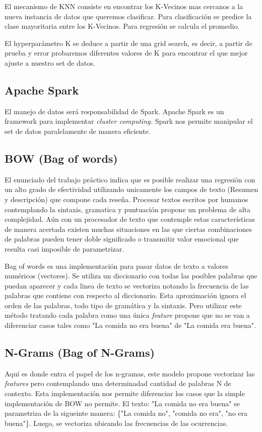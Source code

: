 \documentclass[a4paper,10pt]{article}
\begin{document}
	El mecanismo de KNN consiste en encontrar los K-Vecinos mas cercanos a la nueva instancia de datos que queremos clasificar. Para clasificaci\'{o}n se predice la clase mayoritaria entre los K-Vecinos. Para regresi\'{o}n se calcula el promedio.
	
	El hyperpar\'{a}metro K se deduce a partir de una grid search, es decir, a partir de prueba y error probaremos diferentes valores de K para encontrar el que mejor ajuste a nuestro set de datos.
	
	\subsection{Apache Spark}
	El manejo de datos ser\'{a} responsabilidad de Spark. Apache Spark es un framework para implementar \textit{cluster computing.} Spark nos permite manipular el set de datos paralelamente de manera eficiente. 
	
	\subsection{BOW (Bag of words)}
	El enunciado del trabajo pr\'{a}ctico indica que es posible realizar una regresi\'{o}n con un alto grado de efectividad utilizando unicamente los campos de texto (Resumen y descripci\'{o}n) que compone cada rese\~{n}a. Procesar textos escritos por humanos contemplando la sintaxis, gramatica y puntuaci\'{o}n propone un problema de alta complejidad. A\'{u}n con un procesador de texto que contemple estas caracter\'{i}sticas de manera acertada existen muchas situaciones en las que ciertas combinaciones de palabras pueden tener doble significado o transmitir valor emocional que resulta casi imposible de parametrizar.
	
	Bag of words es una implementaci\'{o}n para pasar datos de texto a valores num\'{e}ricos (vectores). Se utiliza un diccionario con todas las posibles palabras que puedan aparecer y cada linea de texto se vectoriza notando la frecuencia de las palabras que contiene con respecto al diccionario. Esta aproximaci\'{o}n ignora el orden de las palabras, todo tipo de gram\'{a}tica y la sintaxis. Pero utilizar este m\'{e}todo tratando cada palabra como una \'{u}nica \textit{feature} propone que no se van a diferenciar casos tales como "La comida no era buena" de "La comida era buena".
	
	\subsection{N-Grams (Bag of N-Grams)}
	Aqu\'{i} es donde entra el papel de los n-gramas, este modelo propone vectorizar las \textit{features} pero contemplando una determinadad cantidad de palabras N de contexto. Esta implementaci\'{o}n nos permite diferenciar los casos que la simple implementaci\'{o}n de BOW no permite.
	El texto: "La comida no era buena" se parametriza de la sigueinte manera: \{"La comida no", "comida no era", "no era buena"\}. Luego, se vectoriza ubicando las frecuencias de las ocurrencias.
	
\end{document}
